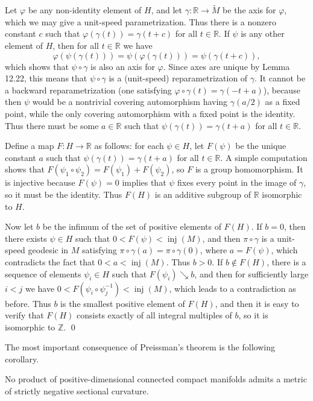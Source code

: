Let $\varphi$ be any non-identity element of $H$, and let $\gamma : \mathbb{R} \to \tilde{M}$ be the axis for $\varphi$, which we may give a unit-speed parametrization. Thus there is a nonzero constant $c$ such that $\varphi(\gamma(t)) = \gamma(t + c)$ for all $t \in \mathbb{R}$. If $\psi$ is any other element of $H$, then for all $t \in \mathbb{R}$ we have
$$\varphi(\psi(\gamma(t))) = \psi(\varphi(\gamma(t))) = \psi(\gamma(t + c)),$$
which shows that $\psi \circ \gamma$ is also an axis for $\varphi$. Since axes are unique by Lemma 12.22, this means that $\psi \circ \gamma$ is a (unit-speed) reparametrization of $\gamma$. It cannot be a backward reparametrization (one satisfying $\varphi \circ \gamma(t) = \gamma(-t + a)$), because then $\psi$ would be a nontrivial covering automorphism having $\gamma(a/2)$ as a fixed point, while the only covering automorphism with a fixed point is the identity. Thus there must be some $a \in \mathbb{R}$ such that $\psi(\gamma(t)) = \gamma(t + a)$ for all $t \in \mathbb{R}$.

Define a map $F : H \to \mathbb{R}$ as follows: for each $\psi \in H$, let $F(\psi)$ be the unique constant $a$ such that $\psi(\gamma(t)) = \gamma(t + a)$ for all $t \in \mathbb{R}$. A simple computation shows that $F(\psi_1 \circ \psi_2) = F(\psi_1) + F(\psi_2)$, so $F$ is a group homomorphism. It is injective because $F(\psi) = 0$ implies that $\psi$ fixes every point in the image of $\gamma$, so it must be the identity. Thus $F(H)$ is an additive subgroup of $\mathbb{R}$ isomorphic to $H$.

Now let $b$ be the infimum of the set of positive elements of $F(H)$. If $b = 0$, then there exists $\psi \in H$ such that $0 < F(\psi) < \operatorname{inj}(M)$, and then $\pi \circ \gamma$ is a unit-speed geodesic in $M$ satisfying $\pi \circ \gamma(a) = \pi \circ \gamma(0)$, where $a = F(\psi)$, which contradicts the fact that $0 < a < \operatorname{inj}(M)$. Thus $b > 0$. If $b \notin F(H)$, there is a sequence of elements $\psi_i \in H$ such that $F(\psi_i) \searrow b$, and then for sufficiently large $i < j$ we have $0 < F(\psi_i \circ \psi_j^{-1}) < \operatorname{inj}(M)$, which leads to a contradiction as before. Thus $b$ is the smallest positive element of $F(H)$, and then it is easy to verify that $F(H)$ consists exactly of all integral multiples of $b$, so it is isomorphic to $\mathbb{Z}$. \qed

The most important consequence of Preissman's theorem is the following corollary.

\begin{corollary}
\label{cor:no-product-negative-sectional-curvature}
No product of positive-dimensional connected compact manifolds admits a metric of strictly negative sectional curvature.
\end{corollary}

